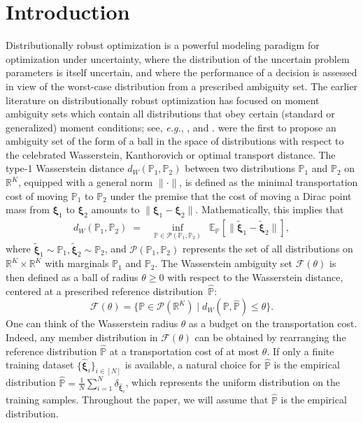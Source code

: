 \documentclass[nonblindrev]{informs2017}
\newcommand{\bmt}[1]{\tilde{\bm{#1}}}
\newcommand{\bmh}[1]{\hat{\bm{#1}}}
\newcommand{\1}[1]{\mathds{1}{\left(#1\right)}}
\begin{document}

\section{Introduction}

Distributionally robust optimization is a powerful modeling paradigm for optimization under uncertainty, where the distribution of the uncertain problem parameters is itself uncertain, and where the performance of a decision is assessed in view of the worst-case distribution from a prescribed ambiguity set. The earlier literature on distributionally robust optimization has focused on moment ambiguity sets which contain all distributions that obey certain (standard or generalized) moment conditions; see, {\em e.g.}, \citet{Delage_Ye_2010}, \citet{Goh_Sim_2010} and \citet{Wiesemann_Kuhn_Sim_2014}. \citet{Pflug_Wozabal_2007} were the first to propose an ambiguity set of the form of a ball in the space of distributions with respect to the celebrated Wasserstein, Kanthorovich or optimal transport distance. The type-1 Wasserstein distance $d_W(\mathbb{P}_1,\mathbb{P}_2)$ between two distributions $\mathbb{P}_1$ and $\mathbb{P}_2$ on $\mathbb{R}^K$, equipped with a general norm $\|\cdot\|$, is defined as the minimal transportation cost of moving $\mathbb{P}_1$ to $\mathbb{P}_2$ under the premise that the cost of moving a Dirac point mass from $\bm\xi_1$ to $\bm\xi_2$ amounts to $\|\bm{\xi}_1 - \bm{\xi}_2\|$. Mathematically, this implies that
$$
\begin{array}{rcl}
d_W(\mathbb{P}_1,\mathbb{P}_2) \; = \; &\displaystyle \inf_{\mathbb{P} \in \mathcal{P}(\mathbb{P}_1, \mathbb{P}_2)}
& \mathbb{E}_{\mathbb{P}}[\|\bmt{\xi}_1 - \bmt{\xi}_2\|] ,
\end{array}
$$
where $\bmt{\xi}_1 \sim \mathbb{P}_1, \bmt{\xi}_2 \sim \mathbb{P}_2$, and $\mathcal{P}(\mathbb{P}_1, \mathbb{P}_2)$ represents the set of all distributions on $\mathbb{R}^K\times \mathbb{R}^K$ with marginals $\mathbb{P}_1$ and $\mathbb{P}_2$. The Wasserstein ambiguity set $\mathcal{F}(\theta)$ is then defined as a ball of radius $\theta\ge 0$ with respect to the Wasserstein distance, centered at a prescribed reference distribution~$\hat{\mathbb{P}}$:
\begin{equation}\label{set:Wasserstein}
\mathcal{F}(\theta) = \{\mathbb{P} \in \mathcal{P}(\mathbb{R}^K) \mid
d_W(\mathbb{P}, \hat{\mathbb{P}}) \leq \theta\}.
\end{equation}
One can think of the Wasserstein radius $\theta$ as a budget on the transportation cost. Indeed, any member distribution in $\mathcal{F}(\theta)$ can be obtained by rearranging the reference  distribution $\hat{\mathbb{P}}$ at a transportation cost of at most $\theta$. If only a finite training dataset $\{\bmh{\xi}_i\}_{i \in [N]}$ is available, a natural choice for $\hat{\mathbb{P}}$ is the empirical distribution $\hat{\mathbb{P}} = \frac{1}{N}\sum_{i = 1}^N \delta_{\bmh{\xi}_i}$, which represents the uniform distribution on the training samples. Throughout the paper, we will assume that $\hat{\mathbb{P}}$ is the empirical distribution.
\end{document}
